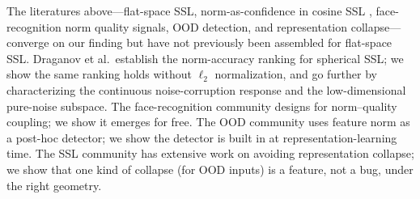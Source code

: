 The literatures above---flat-space SSL, norm-as-confidence in cosine SSL \citep{draganov2025embedding_norms, tack2020csi}, face-recognition norm quality signals, OOD detection, and representation collapse---converge on our finding but have not previously been assembled for flat-space SSL. Draganov et al.~establish the norm-accuracy ranking for spherical SSL; we show the same ranking holds without $\ell_2$ normalization, and go further by characterizing the continuous noise-corruption response and the low-dimensional pure-noise subspace. The face-recognition community designs for norm--quality coupling; we show it emerges for free. The OOD community uses feature norm as a post-hoc detector; we show the detector is built in at representation-learning time. The SSL community has extensive work on avoiding representation collapse; we show that one kind of collapse (for OOD inputs) is a feature, not a bug, under the right geometry.
